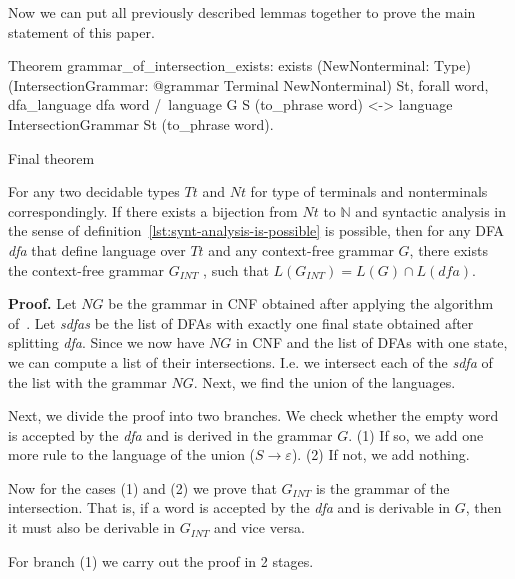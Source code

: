 Now we can put all previously described lemmas together to prove the main statement of this paper.

\begin{listing}[h]
    \begin{pyglist}[language=coq, numbers=none, numbersep=5pt]

Theorem grammar_of_intersection_exists:
  exists 
   (NewNonterminal: Type) 
   (IntersectionGrammar: 
      @grammar Terminal NewNonterminal) St,
  forall word,
    dfa_language dfa word /\ 
	    language G S (to_phrase word) <->
    language IntersectionGrammar St 
	         (to_phrase word).
   \end{pyglist}
\caption{Final theorem}
\label{lst:lang-eq}
\end{listing}

\begin{theorem}
    For any two decidable types $Tt$ and $Nt$ for type of terminals and nonterminals correspondingly.
    If there exists a bijection from $Nt$ to $\mathbb{N}$ and syntactic analysis in the sense of definition~\ref{lst:synt-analysis-is-possible} is possible, then for any DFA \textit{dfa} that define language over $Tt$ and any context-free grammar $G$, there exists the context-free grammar $G_{INT}$ , such that $L(G_{INT}) = L(G) \cap L(\textit{dfa})$.
\end{theorem}   

\textbf{Proof.} 
Let $NG$ be the grammar in CNF obtained after applying the algorithm of~\cite{smolkaHofmann2016}. Let \textit{sdfas} be the list of DFAs with exactly one final state obtained after splitting \textit{dfa}.
Since we now have $NG$ in CNF and the list of DFAs with one state, we can compute a list of their intersections.
I.e. we intersect each of the \textit{sdfa} of the list with the grammar $NG$.
Next, we find the union of the languages. 

Next, we divide the proof into two branches.
We check whether the empty word is accepted by the \textit{dfa} and is derived in the grammar $G$.
(1) If so, we add one more rule to the language of the union ($ S \to \varepsilon$). (2) If not, we add nothing.

Now for the cases (1) and (2) we prove that $G_{INT}$ is the grammar of the intersection.
That is, if a word is accepted by the \textit{dfa} and is derivable in $G$, then it must also be derivable in $G_{INT}$ and vice versa.

For branch (1) we carry out the proof in 2 stages.

